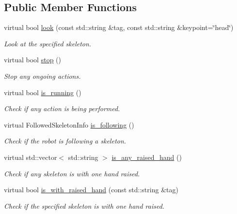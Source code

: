 \subsection*{Public Member Functions}
\begin{DoxyCompactItemize}
\item 
virtual bool \mbox{\hyperlink{classattentionManager__IDL_a42941cc508bb57aa390578ecdbfde7c2}{look}} (const std\+::string \&tag, const std\+::string \&keypoint=\char`\"{}head\char`\"{})
\begin{DoxyCompactList}\small\item\em Look at the specified skeleton. \end{DoxyCompactList}\item 
virtual bool \mbox{\hyperlink{classattentionManager__IDL_aa5e3fb18a0336d8b65c316e7f6a675a8}{stop}} ()
\begin{DoxyCompactList}\small\item\em Stop any ongoing actions. \end{DoxyCompactList}\item 
virtual bool \mbox{\hyperlink{classattentionManager__IDL_ada750e5a7c6a0bb99be495e24d34dcdd}{is\+\_\+running}} ()
\begin{DoxyCompactList}\small\item\em Check if any action is being performed. \end{DoxyCompactList}\item 
virtual Followed\+Skeleton\+Info \mbox{\hyperlink{classattentionManager__IDL_a03b844a8bd3d6e2b4cf5ba88ace27429}{is\+\_\+following}} ()
\begin{DoxyCompactList}\small\item\em Check if the robot is following a skeleton. \end{DoxyCompactList}\item 
virtual std\+::vector$<$ std\+::string $>$ \mbox{\hyperlink{classattentionManager__IDL_ad0b7882cea4dd8b0269cd3eaf0f5dbae}{is\+\_\+any\+\_\+raised\+\_\+hand}} ()
\begin{DoxyCompactList}\small\item\em Check if any skeleton is with one hand raised. \end{DoxyCompactList}\item 
virtual bool \mbox{\hyperlink{classattentionManager__IDL_aa6b2c971be0e878ab259675c83bba2dc}{is\+\_\+with\+\_\+raised\+\_\+hand}} (const std\+::string \&tag)
\begin{DoxyCompactList}\small\item\em Check if the specified skeleton is with one hand raised. \end{DoxyCompactList}\item 

\end{DoxyCompactItemize}
